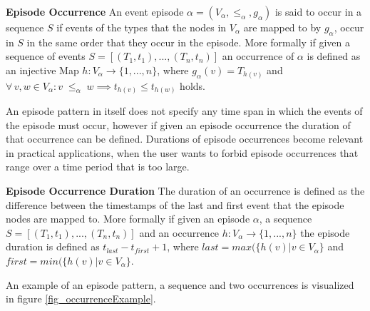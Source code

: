 \begin{mydef}
\label{def_episodeOccurrence}
\textbf{Episode Occurrence} An event episode $\alpha = (V_\alpha,{\leq}_{\alpha},g_\alpha)$ is said to occur in a sequence $S$ if events of the types that the nodes in $V_\alpha$ are mapped to by $g_\alpha$, occur in $S$ in the same order that they occur in the episode. More formally if given a sequence of events $S=[(T_1,t_1),...,(T_n,t_n)]$ an occurrence of $\alpha$ is defined as an injective Map $h:V_\alpha \rightarrow \{1,...,n\}$, where $g_\alpha (v) = T_{h(v)}$ and $\forall \, v,w \in V_\alpha : v \;{\leq}_{\alpha}\; w \implies t_{h(v)} \le t_{h(w)}$ holds. \cite{mannila1995discovering}
\end{mydef}

An episode pattern in itself does not specify any time span in which the events of the episode must occur, however if given an episode occurrence the duration of that occurrence can be defined. Durations of episode occurrences become relevant in practical applications, when the user wants to forbid episode occurrences that range over a time period that is too large. 

\begin{mydef}
\label{def_episodeOccurrence}
\textbf{Episode Occurrence Duration} The duration of an occurrence is defined as the difference between the timestamps of the last and first event that the episode nodes are mapped to. More formally if given an episode $\alpha$, a sequence $S=[(T_1,t_1),...,(T_n,t_n)]$ and an occurrence $h:V_\alpha \rightarrow \{1,...,n\}$ the episode duration is defined as $t_{last} - t_{first}+1$, where $last = max( \{h(v)| v \in V_\alpha \}$ and $first = min( \{h(v)| v \in V_\alpha \}$.
\end{mydef}

An example of an episode pattern, a sequence and two occurrences is visualized in figure \ref{fig_occurrenceExample}.

